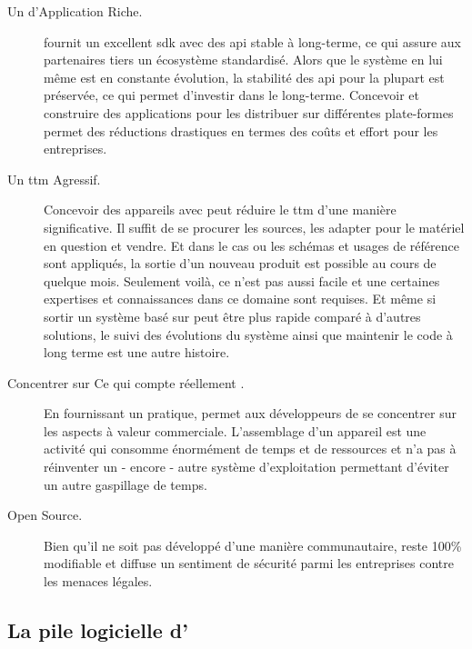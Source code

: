 \begin{description}

\item [Un  d'Application Riche.] \android{} fournit un
excellent \gls{sdk} avec des \gls{api} stable à long-terme, ce qui
assure aux partenaires tiers un écosystème standardisé. Alors que le
système en lui même est en constante évolution, la stabilité des
\gls{api} pour la plupart est préservée, ce qui permet d'investir dans
le long-terme. Concevoir et construire des applications pour les
distribuer sur différentes plate-formes permet des réductions drastiques en
termes des coûts et effort pour les entreprises.

\item [Un \gls{ttm} Agressif.] Concevoir des appareils avec \android{}
peut réduire le \gls{ttm} d'une manière significative. Il suffit de se
procurer les sources, les adapter pour le matériel en question et vendre. Et dans le cas ou les schémas et usages de référence sont
appliqués, la sortie d'un nouveau produit est possible au cours de quelque
mois. Seulement voilà, ce n'est pas aussi facile et une certaines expertises
et connaissances dans ce domaine sont requises. Et même si sortir un
système basé sur \android{} peut être plus rapide comparé à d'autres
solutions, le suivi des évolutions du système ainsi que maintenir le
code à long terme est une autre histoire.

\item [Concentrer sur \og Ce qui compte réellement \fg.] En fournissant
un  pratique, \android{} permet aux développeurs de se
concentrer sur les aspects à valeur commerciale. L'assemblage d'un
appareil est une activité qui consomme énormément de temps et de
ressources et n'a pas à réinventer un - encore - autre système d'exploitation permettant d'éviter un autre gaspillage de temps.

\item [Open Source.] Bien qu'il ne soit pas développé d'une manière
communautaire, \android{} reste 100\% modifiable et diffuse un sentiment
de sécurité parmi les entreprises contre les menaces légales.

\end{description}

\subsection[La pile logicielle d'\android{}]{La pile logicielle d'\android{}\cite{pa4ad:chptr1}}

